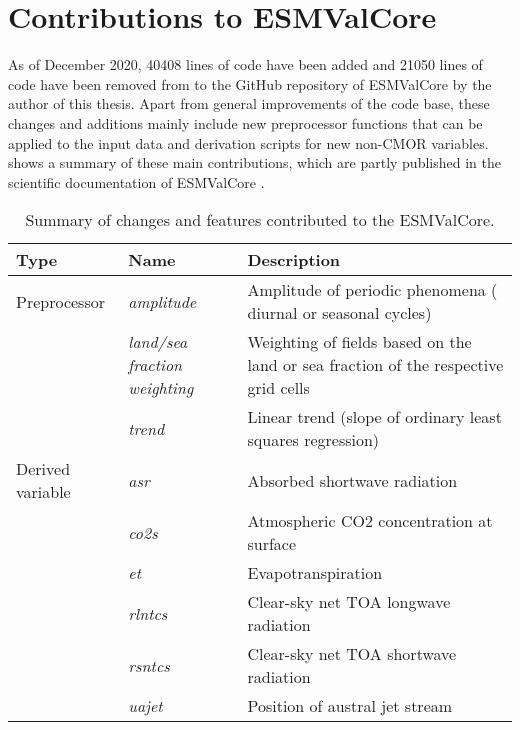 \section{Contributions to \acs{ESMValCore}}
\label{sec:03:contributions_to_esmvalcore}

As of December 2020, 40408 lines of code have been added and 21050 lines of
code have been removed from to the GitHub repository of \ac{ESMValCore} by the
author of this thesis. Apart from general improvements of the code base, these
changes and additions mainly include new preprocessor functions that can be
applied to the input data and derivation scripts for new non-\ac{CMOR}
variables.  shows a summary of these main
contributions, which are partly published in the scientific documentation of
\ac{ESMValCore} \autocite{Righi2020}.

\begin{table}[t]
  \centering
  \begin{tabulary}{\columnwidth}{L L L}
    \toprule
    Type & Name & Description \\
    \midrule
    Preprocessor & \emph{amplitude} & Amplitude of periodic phenomena (\eg{}
    diurnal or seasonal cycles) \\
    \cmidrule(l){2-3}
    & \emph{land/sea fraction weighting} & Weighting of fields based on
    the land or sea fraction of the respective grid cells \\
    \cmidrule(l){2-3}
    & \emph{trend} & Linear trend (slope of ordinary least squares regression)
    \\
    \midrule
    Derived variable & \emph{asr} & Absorbed shortwave radiation \\
    \cmidrule(l){2-3}
    & \emph{co2s} & Atmospheric \ac{CO2} concentration at
    surface \\
    \cmidrule(l){2-3}
    & \emph{et} & Evapotranspiration \\
    \cmidrule(l){2-3}
    & \emph{rlntcs} & Clear-sky net \acf{TOA} longwave radiation \\
    \cmidrule(l){2-3}
    & \emph{rsntcs} & Clear-sky net \ac{TOA} shortwave radiation \\
    \cmidrule(l){2-3}
    & \emph{uajet} & Position of austral jet stream \\
    \bottomrule
  \end{tabulary}
  \caption{Summary of changes and features contributed to the
    \acf{ESMValCore}.}
  \label{tab:03:changes_to_esmvalcore}
\end{table}

